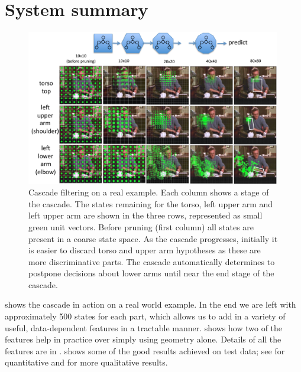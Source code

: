 \section{System summary}
\begin{figure}[tb]
\begin{center}
\includegraphics[width=0.99\textwidth]{figs/CPS-overview2.pdf}
\caption[Cascade filtering in practice.]{Cascade filtering on a real example.  
Each column shows a stage of the cascade. The states remaining for the torso, 
left upper arm and left upper arm are shown in the three rows, represented as 
small green unit vectors.  Before pruning (first column) all states are present 
in a coarse state space.  As the cascade progresses, initially it is easier to 
discard torso and upper arm hypotheses as these are more discriminative parts.  
The cascade automatically determines to postpone decisions about lower arms 
until near the end stage of the cascade.}
\label{fig:cps-overview}
\end{center}
\end{figure}


 shows the cascade in action on a real world example.  In 
the end we are left with approximately 500 states for each part, which allows 
us to add in a variety of useful, data-dependent features in a tractable 
manner.   shows how two of the features help 
in practice over simply using geometry alone.  Details of all the features are 
in .   shows some of the 
good results achieved on test data; see  for quantitative and 
 for more qualitative results.

